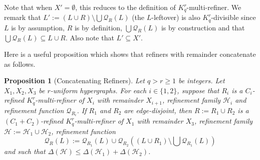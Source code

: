 \documentclass[11pt]{article}
\newcounter{i}
\theoremstyle{plain}
\newtheorem{proposition}[thm]{Proposition}
\theoremstyle{plain} %
\theoremstyle{definition}
\begin{document}
Note that when $X'=\emptyset$, this reduces to the definition of $K_q^r$-multi-refiner. We remark that $L':= (L\cup R) \setminus \bigcup \mathcal{Q}_R(L)$ (the $L$-leftover) is also $K_q^r$-divisible since $L$ is by assumption, $R$ is by definition, $\bigcup \mathcal{Q}_R(L)$ is by construction and that $\bigcup \mathcal{Q}_R(L) \subseteq L\cup R$. 
Also note that $L'\subseteq X'$.

Here is a useful proposition which shows that refiners with remainder concatenate as follows.

\begin{proposition}[Concatenating Refiners]\label{prop:Concatenate}
Let $q > r \ge 1$ be integers. Let $X_1, X_2, X_3$ be $r$-uniform hypergraphs. For each $i\in \{1,2\}$, suppose that $R_i$ is a $C_i$-refined $K_q^r$-multi-refiner of $X_i$ with remainder $X_{i+1}$,  refinement family $\mathcal{H}_i$ and refinement function $\mathcal{Q}_{R_i}$. If $R_1$ and $R_2$ are edge-disjoint, then $R:= R_1\cup R_2$ is a $(C_1+C_2)$-refined $K_q^r$-multi-refiner of $X_1$ with remainder $X_3$, refinement family $\mathcal{H}:= \mathcal{H}_1\cup \mathcal{H}_2$, refinement function $$\mathcal{Q}_R(L):= \mathcal{Q}_{R_1}(L) \cup \mathcal{Q}_{R_2}\left((L\cup R_1)\setminus \bigcup \mathcal{Q}_{R_1}(L)\right)$$ 
and such that $\Delta(\mathcal{H}) \le \Delta(\mathcal{H}_1) + \Delta(\mathcal{H}_2)$.     
\end{proposition}
\end{document}
